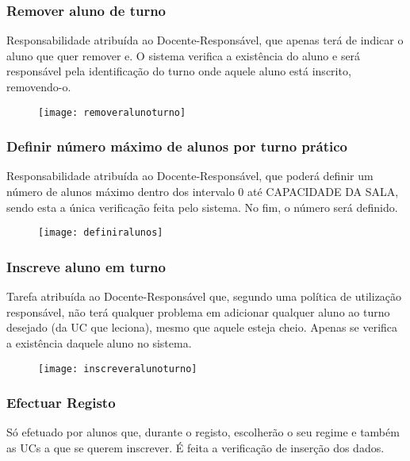 \documentclass[a4paper]{article}
\begin{document}
\subsubsection{Remover aluno de turno}
\hspace{3mm}Responsabilidade atribuída ao Docente-Responsável, que apenas terá de indicar o aluno que quer remover e. O sistema verifica a existência do aluno e será responsável pela identificação do turno onde aquele aluno está inscrito, removendo-o.

\begin{figure}[H]
\centering
\texttt{[image: removeralunoturno]}
\caption{}
\label{fig:10}
\end{figure}
\pagebreak

\subsubsection{Definir número máximo de alunos por turno prático}
\hspace{3mm}Responsabilidade atribuída ao Docente-Responsável, que poderá definir um número de alunos máximo dentro dos intervalo 0 até CAPACIDADE DA SALA, sendo esta a única verificação feita pelo sistema. No fim, o número será definido.

\begin{figure}[H]
\centering
\texttt{[image: definiralunos]}
\caption{}
\label{fig:11}
\end{figure}


\subsubsection{Inscreve aluno em turno}
\hspace{3mm}Tarefa atribuída ao Docente-Responsável que, segundo uma política de utilização responsável, não terá qualquer problema em adicionar qualquer aluno ao turno desejado (da UC que leciona), mesmo que aquele esteja cheio. Apenas se verifica a existência daquele aluno no sistema.

\begin{figure}[H]
\centering
\texttt{[image: inscreveralunoturno]}
\caption{}
\label{fig:12}
\end{figure}

\pagebreak
\subsubsection{Efectuar Registo}
\hspace{3mm}Só efetuado por alunos que, durante o registo, escolherão o seu regime e também as UCs a que se querem inscrever. É feita a verificação de inserção dos dados.
\end{document}

